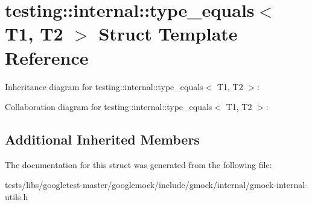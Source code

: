 \hypertarget{structtesting_1_1internal_1_1type__equals}{}\section{testing\+:\+:internal\+:\+:type\+\_\+equals$<$ T1, T2 $>$ Struct Template Reference}
\label{structtesting_1_1internal_1_1type__equals}


Inheritance diagram for testing\+:\+:internal\+:\+:type\+\_\+equals$<$ T1, T2 $>$\+:


Collaboration diagram for testing\+:\+:internal\+:\+:type\+\_\+equals$<$ T1, T2 $>$\+:
\subsection*{Additional Inherited Members}


The documentation for this struct was generated from the following file\+:\begin{DoxyCompactItemize}
\item 
tests/libs/googletest-\/master/googlemock/include/gmock/internal/gmock-\/internal-\/utils.\+h\end{DoxyCompactItemize}
